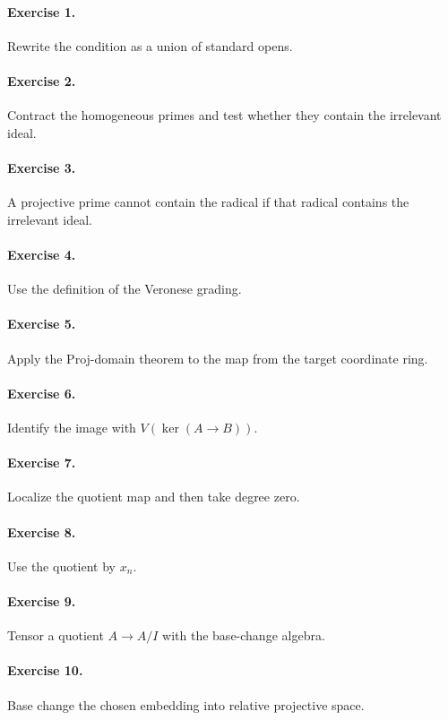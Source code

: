 \paragraph{Exercise 1.} Rewrite the condition as a union of standard opens.

\paragraph{Exercise 2.} Contract the homogeneous primes and test whether they contain the irrelevant ideal.

\paragraph{Exercise 3.} A projective prime cannot contain the radical if that radical contains the irrelevant ideal.

\paragraph{Exercise 4.} Use the definition of the Veronese grading.

\paragraph{Exercise 5.} Apply the Proj-domain theorem to the map from the target coordinate ring.

\paragraph{Exercise 6.} Identify the image with \(V(\ker(A\to B))\).

\paragraph{Exercise 7.} Localize the quotient map and then take degree zero.

\paragraph{Exercise 8.} Use the quotient by \(x_n\).

\paragraph{Exercise 9.} Tensor a quotient \(A\to A/I\) with the base-change algebra.

\paragraph{Exercise 10.} Base change the chosen embedding into relative projective space.

